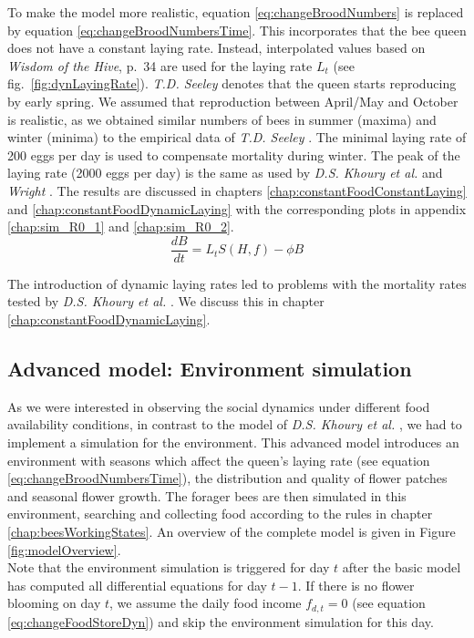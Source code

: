 		To make the model more realistic, equation \ref{eq:changeBroodNumbers} is replaced by equation \ref{eq:changeBroodNumbersTime}. This incorporates that the bee queen does not have a constant laying rate. Instead, interpolated values based on \textit{Wisdom of the Hive}, p.~34 \cite{seeley95} are used for the laying rate $L_t$ (see fig.~\ref{fig:dynLayingRate}). \textit{T.D. Seeley} denotes that the queen starts reproducing by early spring. We assumed that reproduction between April/May and October is realistic, as we obtained similar numbers of bees in summer (maxima) and winter (minima) to the empirical data of \textit{T.D. Seeley} \cite{seeley95}. The minimal laying rate of 200 eggs per day is used to compensate mortality during winter. The peak of the laying rate (2000 eggs per day) is the same as used by \textit{D.S. Khoury et al.} \cite{khoury13} and \textit{Wright} \cite{wright08}. The results are discussed in chapters \ref{chap:constantFoodConstantLaying} and \ref{chap:constantFoodDynamicLaying} with the corresponding plots in appendix \ref{chap:sim_R0_1} and \ref{chap:sim_R0_2}.		
		\begin{equation}\label{eq:changeBroodNumbersTime}
			\frac{dB}{dt} = L_tS(H,f)-\phi B
		\end{equation}
		
		The introduction of dynamic laying rates led to problems with the mortality rates tested by \textit{D.S. Khoury et al.} \cite{khoury13}. We discuss this in chapter \ref{chap:constantFoodDynamicLaying}.
	
	\subsection{Advanced model: Environment simulation}
		\label{chap:advancedModel}
		

		As we were interested in observing the social dynamics under different food availability conditions, in contrast to the model of \textit{D.S. Khoury et al.} \cite{khoury13}, we had to implement a simulation for the environment. This advanced model introduces an environment with seasons which affect the queen's laying rate (see equation \ref{eq:changeBroodNumbersTime}), the distribution and quality of flower patches and seasonal flower growth.
		The forager bees are then simulated in this environment, searching and collecting food according to the rules in chapter \ref{chap:beesWorkingStates}. An overview of the complete model is given in Figure \ref{fig:modelOverview}.\\
		Note that the environment simulation is triggered for day $t$ after the basic model has computed all differential equations for day $t-1$. If there is no flower blooming on day $t$, we assume the daily food income $f_{d,t} = 0$ (see equation \ref{eq:changeFoodStoreDyn}) and skip the environment simulation for this day.
		
